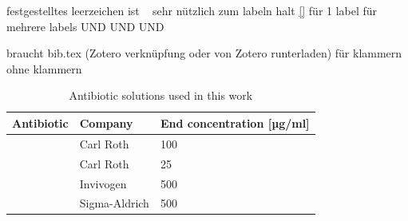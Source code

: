 
festgestelltes leerzeichen ist  ~   sehr nützlich
\label{} zum labeln halt
\ref{} für 1 label
 für mehrere labels
\gls{} UND  \Gls{}  UND  \glsxtrshort{} UND \glsxtrlong{}

braucht bib.tex (Zotero verknüpfung oder von Zotero runterladen)
\parencite{} für klammern
\cite{} ohne klammern
\begin{table}[H]
        \caption{Antibiotic solutions used in this work}
        \label{tab:antibiotic_sol}
        \begin{tabular}{|Y{4.8cm}|Y{3cm}|Y{6cm}|}
            \hline
                \textbf{Antibiotic} &  \textbf{Company} & \textbf{End concentration [µg/ml]} \\ 
            \hline
                \textbf{} & Carl Roth  & 100 \\
                \textbf{} & Carl Roth  & 25 \\ 
                \textbf{} & Invivogen  & 500  \\ 
                \textbf{} & Sigma-Aldrich & 500 \\
            \hline
        \end{tabular}
    \end{table}
